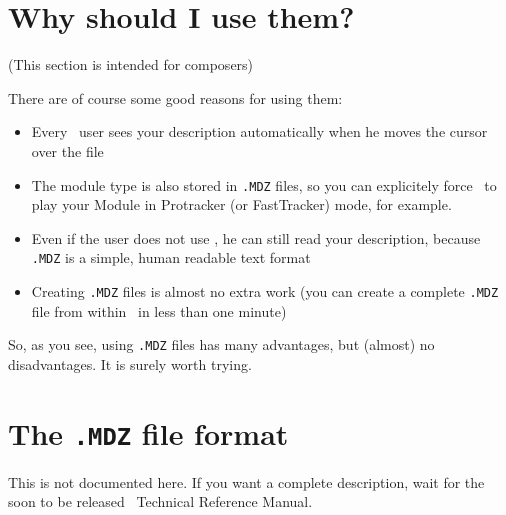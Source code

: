\section{Why should I use them?}

(This section is intended for composers)

There are of course some good reasons for using them:

\begin{itemize}
\item{Every \cp\ user sees your description automatically when he moves the
cursor over the file}
\item{The module type is also stored in \texttt{.MDZ} files, so you can
explicitely force \cp\ to play your Module in Protracker (or FastTracker)
mode, for example.}
\item{Even if the user does not use \cp, he can still read your description,
because \texttt{.MDZ} is a simple, human readable text format}
\item{Creating \texttt{.MDZ} files is almost no extra work (you can create a
complete \texttt{.MDZ} file from within \cp\ in less than one minute)}
\end{itemize}

So, as you see, using \texttt{.MDZ} files has many advantages, but (almost)
no disadvantages. It is surely worth trying.

\section{The \texttt{.MDZ} file format}

This is not documented here. If you want a complete description, wait for the
soon to be released \cp\ Technical Reference Manual.

